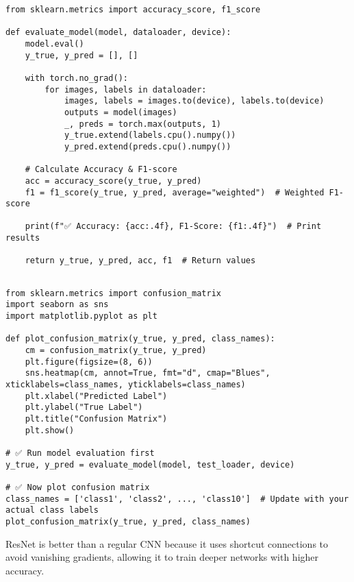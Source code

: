 \documentclass{article}
\begin{document}
\begin{verbatim}
from sklearn.metrics import accuracy_score, f1_score

def evaluate_model(model, dataloader, device):
    model.eval()
    y_true, y_pred = [], []

    with torch.no_grad():
        for images, labels in dataloader:
            images, labels = images.to(device), labels.to(device)
            outputs = model(images)
            _, preds = torch.max(outputs, 1)
            y_true.extend(labels.cpu().numpy())
            y_pred.extend(preds.cpu().numpy())

    # Calculate Accuracy & F1-score
    acc = accuracy_score(y_true, y_pred)
    f1 = f1_score(y_true, y_pred, average="weighted")  # Weighted F1-score

    print(f"✅ Accuracy: {acc:.4f}, F1-Score: {f1:.4f}")  # Print results

    return y_true, y_pred, acc, f1  # Return values


\end{verbatim}

\begin{verbatim}
from sklearn.metrics import confusion_matrix
import seaborn as sns
import matplotlib.pyplot as plt

def plot_confusion_matrix(y_true, y_pred, class_names):
    cm = confusion_matrix(y_true, y_pred)
    plt.figure(figsize=(8, 6))
    sns.heatmap(cm, annot=True, fmt="d", cmap="Blues", xticklabels=class_names, yticklabels=class_names)
    plt.xlabel("Predicted Label")
    plt.ylabel("True Label")
    plt.title("Confusion Matrix")
    plt.show()

# ✅ Run model evaluation first
y_true, y_pred = evaluate_model(model, test_loader, device)

# ✅ Now plot confusion matrix
class_names = ['class1', 'class2', ..., 'class10']  # Update with your actual class labels
plot_confusion_matrix(y_true, y_pred, class_names)

\end{verbatim}

ResNet is better than a regular CNN because it uses shortcut connections to avoid vanishing gradients, allowing it to train deeper networks with higher accuracy.
\end{document}
